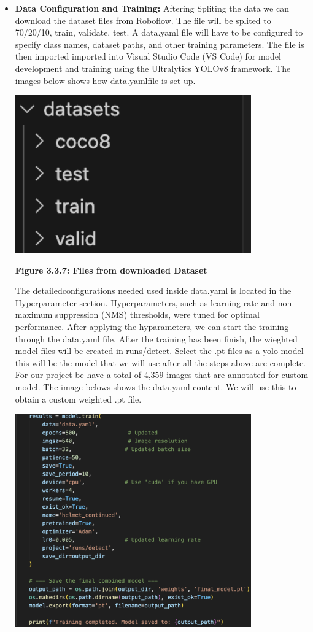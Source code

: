 \begin{itemize}
	\item \textbf{Data Configuration and Training:} Aftering Spliting the data we can download the dataset files from Roboflow. The file will be splited to 70/20/10, train, validate, test. A data.yaml file will have to be  configured to specify class names, dataset paths, and other training parameters. The file is then imported imported into Visual Studio Code (VS Code) for model development and training using the Ultralytics YOLOv8 framework. The images below shows how data.yamlfile is set up.
	\begin{center}
		\includegraphics[width=0.8\textwidth]{Files.png}
		
		\vspace{0.5em}
		\textbf{Figure 3.3.7:  Files from downloaded Dataset }
	\end{center}
	The detailedconfigurations needed used inside data.yaml is located in the Hyperparameter section.
	Hyperparameters, such as learning rate and non-maximum suppression (NMS) thresholds, were tuned for optimal performance.  After applying the hyparameters, we can start the training through the data.yaml file. After the training has been finish, the wieghted model files will be created in runs/detect. Select the .pt files as a yolo model this will be the model that we will use after all the steps above are complete. For our project be have a total of 4,359 images that are annotated for custom model. The image belows shows the data.yaml content. We will use this to obtain a custom weighted  .pt file.
	\begin{center}
		\includegraphics[width=0.8\textwidth]{yaml.png}
		

\end{center}
\end{itemize}
